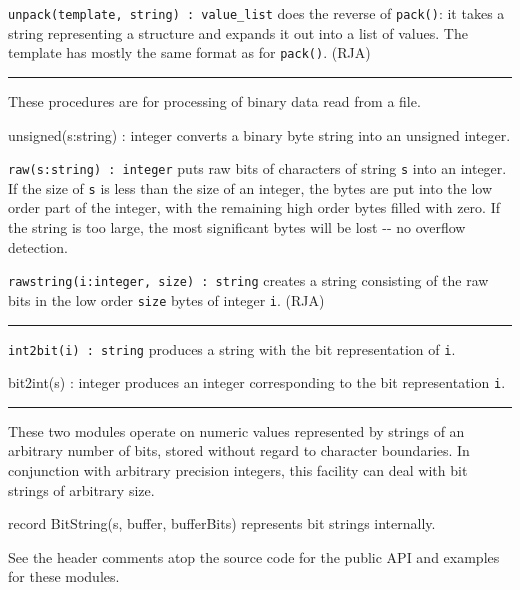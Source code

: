 \texttt{unpack(template, string) : value\_list} does the reverse of
\texttt{pack()}: it takes a string representing a structure and expands
it out into a list of values. The template has mostly the same format
as for \texttt{pack()}. (RJA)

\vspace{0.25cm}\hrule{}

These procedures are for processing of binary data
read from a file.

\textsf{unsigned(s:string) : integer} converts a binary byte string into
an unsigned integer.

\texttt{raw(s:string) : integer} puts raw bits of characters of string
\texttt{s} into an integer. If the size of \texttt{s} is less than the
size of an integer, the bytes are put into the low order part of the
integer, with the remaining high order bytes filled with zero. If the
string is too large, the most significant bytes will be lost -{}- no
overflow detection.

\texttt{rawstring(i:integer, size) : string} creates a string consisting
of the raw bits in the low order \texttt{size} bytes of integer
\texttt{i}. (RJA)

\vspace{0.25cm}\hrule{}

\texttt{int2bit(i) : string} produces a string with the bit
representation of \texttt{i}.

\textsf{bit2int(s) : integer} produces an integer corresponding to the
bit representation \texttt{i}. 

\vspace{0.25cm}\hrule{}

These two modules operate on numeric values represented by strings of an
arbitrary number of bits, stored without regard to character
boundaries. In conjunction with arbitrary precision integers, this
facility can deal with bit strings of arbitrary size.

record BitString(s, buffer, bufferBits) represents bit
strings internally.

See the header comments atop the source code for the public API and examples
for these modules.


